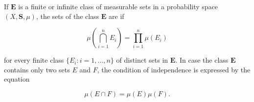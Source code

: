 If $\mathbf{E}$ is a finite or infinite class of measurable sets in a probability space $(X, \mathbf{S}, \mu)$, the sets of the class $\mathbf{E}$ are  if

$$\mu\left(\bigcap_{i=1}^{n} E_i\right) = \prod_{i=1}^{n} \mu(E_i)$$

for every finite class $\{E_i : i = 1, \dots, n\}$ of distinct sets in $\mathbf{E}$. In case the class $\mathbf{E}$ contains only two sets $E$ and $F$, the condition of independence is expressed by the equation

$$\mu(E \cap F) = \mu(E) \mu(F).$$
